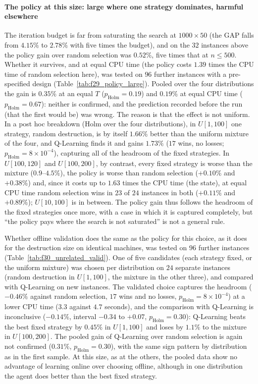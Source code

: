 \documentclass[final,3p,times,11pt,authoryear]{elsarticle}
\begin{document}
\paragraph{The policy at this size: large where one strategy dominates, harmful elsewhere}
The iteration budget is far from saturating the search at $1000\times50$ (the GAP falls
from $4.15\%$ to $2.78\%$ with five times the budget), and on the $32$ instances above the
policy gain over random selection was $0.52\%$, five times that at $n\leq500$. Whether it
survives, and at equal CPU time (the policy costs $1.39$ times the CPU time of random
selection here), was tested on $96$ further instances with a pre-specified design
(Table~\ref{tab:f29_policy_large}). Pooled over the four distributions the gain is
$0.35\%$ at an equal $T$ ($p_{\mathrm{Holm}}=0.19$) and $0.19\%$ at equal CPU time
($p_{\mathrm{Holm}}=0.67$): neither is confirmed, and the prediction recorded before the
run (that the first would be) was wrong. The reason is that the effect is not uniform. In a
post hoc breakdown (Holm over the four distributions), in $U[1,100]$ one strategy,
random destruction, is by itself $1.66\%$ better than the uniform mixture of the four, and
Q-Learning finds it and gains $1.73\%$ ($17$ wins, no losses; $p_{\mathrm{Holm}}=8\times10^{-4}$),
capturing all of the headroom of the fixed strategies. In $U[100,120]$ and $U[100,200]$,
by contrast, every fixed strategy is worse than the mixture ($0.9$--$4.5\%$), the policy
is worse than random selection ($+0.10\%$ and $+0.38\%$) and, since it costs up to $1.63$
times the CPU time (the state), at equal CPU time random selection wins in $23$ of $24$
instances in both ($+0.11\%$ and $+0.89\%$); $U[10,100]$ is in between. The policy gain thus
follows the headroom of the fixed strategies once more, with a case in which it is
captured completely, but ``the policy pays where the search is not saturated'' is not a
general rule.



Whether offline validation does the same as the policy for this choice, as it does for the
destruction size on identical machines, was tested on $96$ further instances
(Table~\ref{tab:f30_unrelated_valid}). One of five candidates (each strategy fixed, or the
uniform mixture) was chosen per distribution on $24$ separate instances (random
destruction in $U[1,100]$, the mixture in the other three), and compared with Q-Learning
on new instances. The validated choice captures the headroom ($-0.46\%$ against random
selection, $17$ wins and no losses, $p_{\mathrm{Holm}}=8\times10^{-4}$) at a lower CPU
time ($3.3$ against $4.7$ seconds), and the comparison with Q-Learning is inconclusive
($-0.14\%$, interval $-0.34$ to $+0.07$, $p_{\mathrm{Holm}}=0.30$): Q-Learning beats the
best fixed strategy by $0.45\%$ in $U[1,100]$ and loses by $1.1\%$ to the mixture in
$U[100,200]$. The pooled gain of Q-Learning over random selection is again not
confirmed ($0.31\%$, $p_{\mathrm{Holm}}=0.30$), with the same sign pattern by distribution
as in the first sample. At this size, as at the others, the pooled data show no advantage
of learning online over choosing offline, although in one distribution the agent does
better than the best fixed strategy.
\end{document}
